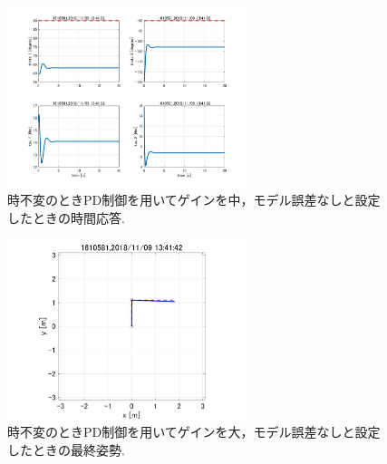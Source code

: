 \documentclass[twocolumn, 10pt,a4j]{jsarticle}
\begin{document}
    \begin{figure}[H]
      \begin{center}
        \includegraphics[width=7cm]{../img/img/kansetu_PD_zifuhen_chu_no_model_gosa_zikan_auto.jpg}
        \caption{時不変のときPD制御を用いてゲインを中，モデル誤差なしと設定したときの時間応答.}
      \end{center}
    \end{figure}
    \begin{figure}[H]
      \begin{center}
        \includegraphics[width=7cm]{../img/img/kansetu_PD_zifuhen_large_no_model_gosa_saisyu_sisei.jpg}
        \caption{時不変のときPD制御を用いてゲインを大，モデル誤差なしと設定したときの最終姿勢.}
      \end{center}
    \end{figure}
\end{document}
